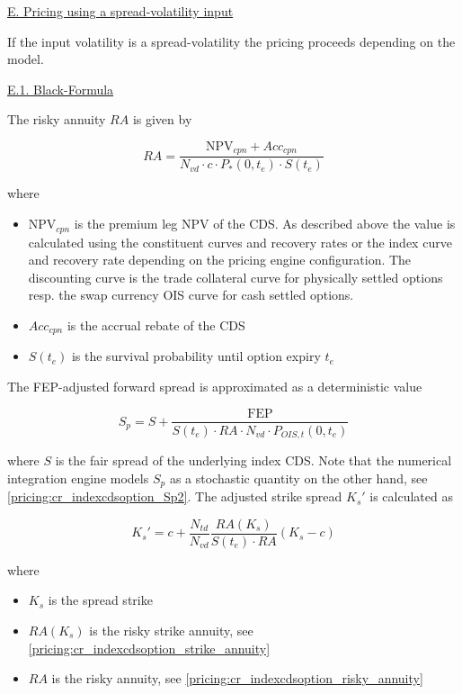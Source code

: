 \underline{E. Pricing using a spread-volatility input}

If the input volatility is a spread-volatility the pricing proceeds depending on the model.

\underline{E.1. Black-Formula}

The risky annuity $RA$ is given by

\begin{equation}\label{pricing:cr_indexcdsoption_risky_annuity}
RA = \frac{\text{NPV}_{cpn} + Acc_{cpn}}{N_{vd} \cdot c \cdot P_{*}(0, t_e) \cdot S(t_e)}
\end{equation}

where

\begin{itemize}
\item $\text{NPV}_{cpn}$ is the premium leg NPV of the CDS. As described above the value is calculated using the
  constituent curves and recovery rates or the index curve and recovery rate depending on the pricing engine
  configuration. The discounting curve is the trade collateral curve for physically settled options resp. the swap
  currency OIS curve for cash settled options.
\item $Acc_{cpn}$ is the accrual rebate of the CDS
\item $S(t_e)$ is the survival probability until option expiry $t_e$
\end{itemize}

The FEP-adjusted forward spread is approximated as a deterministic value

\begin{equation}\label{pricing:cr_indexcdsoption_Sp}
S_p = S + \frac{\text{FEP}}{S(t_e) \cdot RA \cdot N_{vd} \cdot P_{OIS,t}(0,t_e)}
\end{equation}

where $S$ is the fair spread of the underlying index CDS. Note that the numerical integration engine models $S_p$ as a
stochastic quantity on the other hand, see \ref{pricing:cr_indexcdsoption_Sp2}. The adjusted strike spread $K_s'$
is calculated as


\begin{equation}\label{pricing:cr_adjusted_strike_spread}
K_s' = c + \frac{N_{td}}{N_{vd}}\frac{RA(K_s)}{S(t_e) \cdot RA} \left( K_s - c \right)
\end{equation}

where

\begin{itemize}
\item $K_s$ is the spread strike
\item $RA(K_s)$ is the risky strike annuity, see \ref{pricing:cr_indexcdsoption_strike_annuity}
\item $RA$ is the risky annuity, see \ref{pricing:cr_indexcdsoption_risky_annuity}
\end{itemize}

